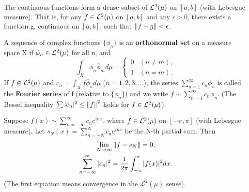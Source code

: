\begin{theorem}
  \label{thm:chap11:density_continuous_L2}
  The continuous functions form a dense subset of $\mathcal{L}^{2}(\mu)$ on
  $[a, b]$ (with Lebesgue measure). That is, for any $f \in
  \mathcal{L}^{2}(\mu)$ on $[a, b]$ and any $\epsilon > 0$, there exists a
  function g, continuous on $[a, b]$, such that $\left\lVert f-g \right\rVert < \epsilon$.
\end{theorem}

\begin{definition}
  \label{def:chap11:orthonormal_L2}
  A sequence of complex functions $\{ \phi_n \}$ is an
  \textbf{orthonormal set} on a measure space X if $\phi_n \in
  \mathcal{L}^{2}(\mu)$ for all n, and
  \[
    \int_X \phi_n \overline{\phi}_m d\mu =
    \begin{cases} 0 & (n \ne m), \\ 1 & (n = m).
    \end{cases}
  \]
  If $f \in \mathcal{L}^{2}(\mu)$ and $c_n = \int_X f \overline{\phi}_n d\mu$
  ($n=1, 2, 3, \dots$), the series $\sum_{n=1}^\infty c_n \phi_n$ is
  called the \textbf{Fourier series} of f (relative to $\{ \phi_n
  \}$) and we write $f \sim \sum_{n=1}^\infty c_n \phi_n$.
  (The Bessel inequality $\sum |c_n|^2 \le \left\lVert f \right\rVert^2$ holds for $f
  \in \mathcal{L}^{2}(\mu)$).
\end{definition}



\begin{theorem}
  \label{thm:chap11:parseval_L2}
  Suppose $f(x) \sim \sum_{n=-\infty}^\infty c_n e^{inx}$, where $f
  \in \mathcal{L}^{2}(\mu)$ on $[-\pi, \pi]$ (with Lebesgue measure). Let
  $s_N(x) = \sum_{n=-N}^N c_n e^{inx}$ be the N-th partial sum. Then
  \begin{gather*}
    \lim_{N \to \infty} \left\lVert f - s_N \right\rVert = 0, \\
    \sum_{n=-\infty}^\infty |c_n|^2 = \frac{1}{2\pi} \int_{-\pi}^\pi
    |f(x)|^2 dx.
  \end{gather*}
  (The first equation means convergence in the $\mathcal{L}^2(\mu)$ sense).
\end{theorem}

